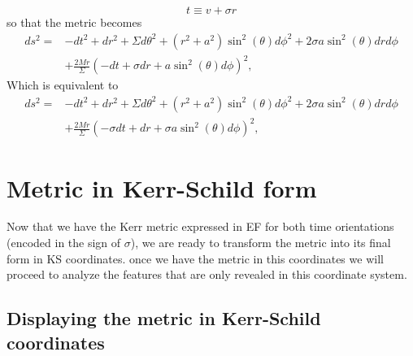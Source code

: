 \begin{Proof}
\begin{equation}
 t \equiv  v + \sigma r
\end{equation}
so that the metric becomes
\begin{equation}
\begin{aligned}
 ds^2=&-dt^2+dr^2+\Sigma d\theta^2+(r^2+a^2) \sin^2{(\theta)} d\phi^2+2\sigma a \sin^2{(\theta)} dr d\phi\\
 &+\frac{2M r}{\Sigma}(-dt+\sigma dr+a \sin^2{(\theta)} d\phi)^2,
 \end{aligned}
\end{equation}
Which is equivalent to
\begin{equation}\label{eq:KerrmetricKerr}
\begin{aligned}
 ds^2=&-dt^2+dr^2+\Sigma d\theta^2+(r^2+a^2) \sin^2{(\theta)} d\phi^2+2\sigma a \sin^2{(\theta)} dr d\phi\\
 &+\frac{2M r}{\Sigma}(-\sigma dt+ dr+\sigma a \sin^2{(\theta)} d\phi)^2,
 \end{aligned}
\end{equation}\end{Proof}

\section{Metric in Kerr-Schild form}

Now that we have the Kerr metric expressed in \gls{EF} for both time orientations (encoded in the sign of $\sigma$), we are ready to transform the metric into its final form in \gls{KS} coordinates. once we have the metric in this coordinates we will proceed to analyze the features that are only revealed in this coordinate system.

\subsection{Displaying the metric in Kerr-Schild coordinates}

